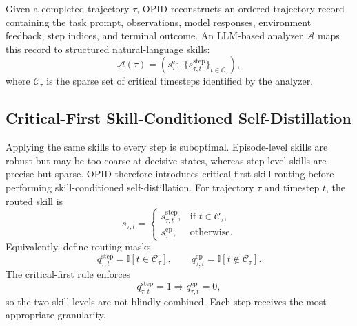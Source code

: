 Given a completed trajectory $\tau$, OPID{} reconstructs an ordered trajectory record containing the task prompt, observations, model responses, environment feedback, step indices, and terminal outcome. An LLM-based analyzer $\mathcal{A}$ maps this record to structured natural-language skills:
\begin{equation*}
    \mathcal{A}(\tau) =
    \left(
        s^{\mathrm{ep}}_{\tau},
        \{s^{\mathrm{step}}_{\tau,t}\}_{t\in\mathcal{C}_\tau}
    \right),
\end{equation*}
where $\mathcal{C}_\tau$ is the sparse set of critical timesteps identified by the analyzer.


\subsection{Critical-First Skill-Conditioned Self-Distillation}

Applying the same skills to every step is suboptimal. Episode-level skills are robust but may be too coarse at decisive states, whereas step-level skills are precise but sparse. OPID{} therefore introduces critical-first skill routing before performing skill-conditioned self-distillation. For trajectory $\tau$ and timestep $t$, the routed skill is
\begin{equation*}
    s_{\tau,t} =
    \begin{cases}
    s^{\mathrm{step}}_{\tau,t}, & \text{if } t\in\mathcal{C}_\tau, \\
    s^{\mathrm{ep}}_{\tau}, & \text{otherwise}.
    \end{cases}
\end{equation*}
Equivalently, define routing masks
\newcommand{\ind}{\mathbb{I}}
\begin{equation*}
    q^{\mathrm{step}}_{\tau,t}=\ind[t\in\mathcal{C}_\tau],
    \qquad
    q^{\mathrm{ep}}_{\tau,t}=\ind[t\notin\mathcal{C}_\tau].
\end{equation*}
The critical-first rule enforces
\begin{equation*}
    q^{\mathrm{step}}_{\tau,t}=1 \Rightarrow q^{\mathrm{ep}}_{\tau,t}=0,
\end{equation*}
so the two skill levels are not blindly combined. Each step receives the most appropriate granularity.

